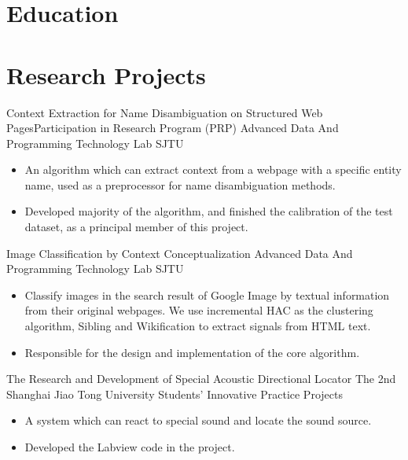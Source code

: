 \documentclass[10pt,a4paper,roman]{moderncv} %
\begin{document}
\makecvtitle

\vspace{-1cm}

\section{Education}

\section{Research Projects}
        {Context Extraction for Name Disambiguation on Structured Web Pages}{Participation in Research Program (PRP)}
        {Advanced Data And Programming Technology Lab\footnotemark{}}
        {SJTU}
        {\begin{itemize}
          \item{An algorithm which can extract context from a webpage with a specific entity name, used as a preprocessor for name disambiguation methods.}
          \item{Developed majority of the algorithm, and finished the calibration of the test dataset, as a principal member of this project.}
         \end{itemize}
        }
        {Image Classification by Context Conceptualization}
        {}
        {Advanced Data And Programming Technology Lab}
        {SJTU}
        {\begin{itemize}
          \item{Classify images in the search result of Google Image by textual information from their original webpages. We use incremental HAC as the clustering algorithm, Sibling and Wikification to extract signals from HTML text.}
          \item{Responsible for the design and implementation of the core algorithm.}
         \end{itemize}
        }
        {The Research and Development of Special Acoustic Directional Locator}
        {The 2nd Shanghai Jiao Tong University Students' Innovative Practice Projects}
        {}
        {}
        {\begin{itemize}
          \item{A system which can react to special sound and locate the sound source.}
          \item{Developed the Labview code in the project.}
         \end{itemize}
        }
\end{document}
